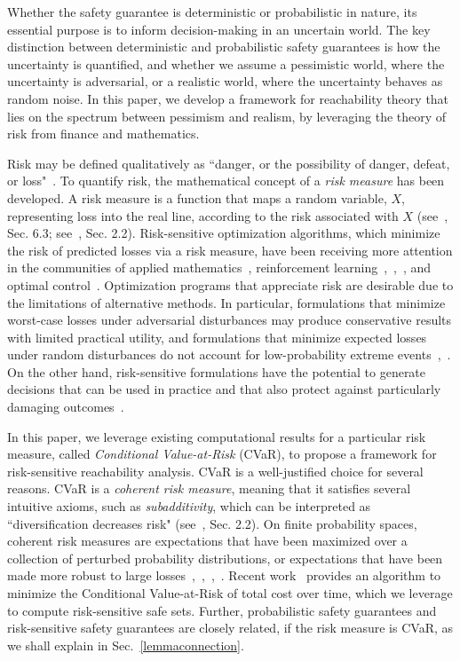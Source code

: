 \documentclass[letterpaper, 10 pt, conference]{ieeeconf}  %
\begin{document}
Whether the safety guarantee is deterministic or probabilistic in nature, 
its essential purpose is to inform decision-making in an uncertain world.
The key distinction between deterministic and probabilistic safety guarantees is how the uncertainty is quantified, and 
whether we assume a pessimistic world, where the uncertainty is adversarial, 
or a realistic world, where the uncertainty behaves as random noise.
In this paper, we develop a framework for reachability theory that lies on the spectrum between pessimism and realism,
by leveraging the theory of risk from finance and mathematics. 

Risk may be defined qualitatively as ``danger, or the possibility of danger, defeat, or loss"~\cite{riskdef}.
To quantify risk, the mathematical concept of a \textit{risk measure} has been developed.
A risk measure is a function that maps a random variable, $X$, representing loss into the real line,
according to the risk associated with $X$ (see~\cite{shapiro2009lectures}, Sec. 6.3; see~\cite{kisiala2015conditional}, Sec. 2.2).
Risk-sensitive optimization algorithms, which minimize the risk of predicted losses via a risk measure,
have been receiving more attention in the communities of applied mathematics~\cite{ruszczynski2010risk}, reinforcement learning~\cite{osogami2012robustness},~\cite{chow2015risk},~\cite{ratliff2017risk}, and optimal control~\cite{chow2014framework}.
Optimization programs that appreciate risk are desirable due to the limitations of alternative methods.
In particular, formulations that minimize worst-case losses under adversarial disturbances
may produce conservative results with limited practical utility, and formulations that minimize expected losses under random disturbances do not account for low-probability extreme events~\cite{chow2014framework},~\cite{jha2018safe}. 
On the other hand, risk-sensitive formulations have the potential to generate decisions that can be used in practice and that also protect
against particularly damaging outcomes~\cite{serraino2013conditional}.

In this paper, we leverage existing computational results for a particular risk measure, called \textit{Conditional Value-at-Risk} (CVaR),
to propose a framework for risk-sensitive reachability analysis. 
CVaR is a well-justified choice for several reasons.
CVaR is a \textit{coherent risk measure}, meaning that it satisfies several intuitive axioms, such as \textit{subadditivity},
which can be interpreted as ``diversification decreases risk" (see~\cite{kisiala2015conditional}, Sec. 2.2).
On finite probability spaces, coherent risk measures are expectations that have been maximized over a collection of perturbed probability distributions,
or expectations that have been made more robust to large losses~\cite{chow2014framework},~\cite{shapiro2009lectures},~\cite{chow2015risk},~\cite{artzner1999coherent}.
Recent work~\cite{chow2015risk} provides an algorithm to minimize the Conditional Value-at-Risk of total cost over time, 
which we leverage to compute risk-sensitive safe sets. Further, probabilistic safety guarantees and 
risk-sensitive safety guarantees are closely related, if the risk measure is CVaR, as we shall explain in Sec.~\ref{lemmaconnection}.
\end{document}
